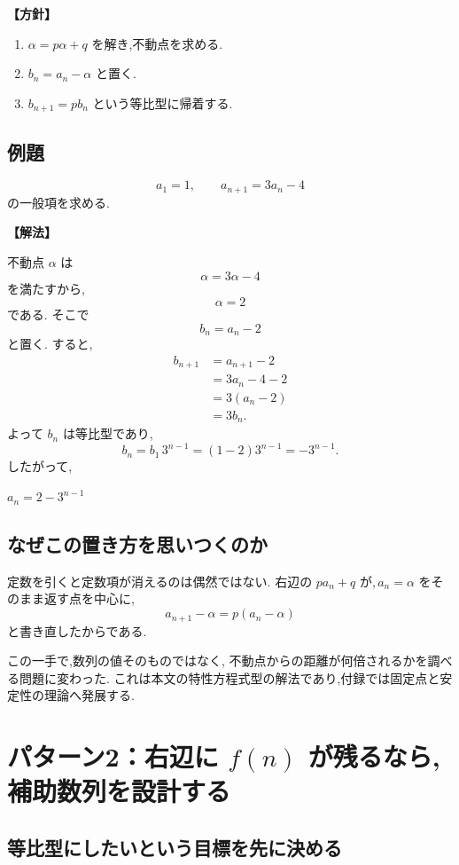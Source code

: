 \noindent\textbf{【方針】}

\begin{enumerate}
  \item $\alpha=p\alpha+q$ を解き,不動点を求める.
  \item $b_n=a_n-\alpha$ と置く.
  \item $b_{n+1}=pb_n$ という等比型に帰着する.
\end{enumerate}

\subsection{例題}

\[
  a_1=1,\qquad a_{n+1}=3a_n-4
\]
の一般項を求める.

\noindent\textbf{【解法】}

不動点 $\alpha$ は
\[
  \alpha=3\alpha-4
\]
を満たすから,
\[
  \alpha=2
\]
である.
そこで
\[
  b_n=a_n-2
\]
と置く.
すると,
\[
\begin{aligned}
  b_{n+1}
  &=a_{n+1}-2\\
  &=3a_n-4-2\\
  &=3(a_n-2)\\
  &=3b_n.
\end{aligned}
\]
よって $b_n$ は等比型であり,
\[
  b_n=b_1\,3^{n-1}=(1-2)3^{n-1}=-3^{n-1}.
\]
したがって,
\begin{mdquote}
  $a_n=2-3^{n-1}$
\end{mdquote}

\subsection{なぜこの置き方を思いつくのか}

定数を引くと定数項が消えるのは偶然ではない.
右辺の $pa_n+q$ が,\,$a_n=\alpha$ をそのまま返す点を中心に,
\[
  a_{n+1}-\alpha=p(a_n-\alpha)
\]
と書き直したからである.

この一手で,数列の値そのものではなく,
不動点からの距離が何倍されるかを調べる問題に変わった.
これは本文の特性方程式型の解法であり,付録では固定点と安定性の理論へ発展する.

\section{パターン2：右辺に $f(n)$ が残るなら,補助数列を設計する}

\subsection{等比型にしたいという目標を先に決める}

